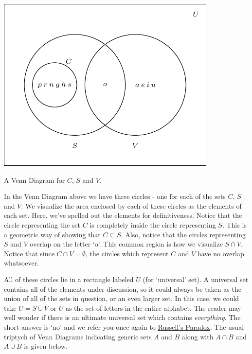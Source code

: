 \documentclass[11pt]{article}
\theoremstyle{definition}  %
\begin{document}
\begin{center}

\includegraphics{SetTheory-1}

A Venn Diagram for $C$, $S$ and $V$.  

\end{center}

In the Venn Diagram above we have three circles - one for each of the sets $C$, $S$ and $V$.  We visualize the area enclosed by each of these circles as the elements of each set.  Here, we've spelled out the elements for definitiveness.  Notice that the circle representing the set $C$ is completely inside the circle representing $S$.  This is a geometric way of  showing that $C \subseteq S$.  Also, notice that the circles representing $S$ and $V$ overlap on the letter `o'.  This common region is how we visualize $S \cap V$.  Notice that since $C \cap V = \emptyset$, the circles which represent $C$ and $V$ have no overlap whatsoever.   

\medskip

All of these circles lie in a rectangle labeled $U$ (for `universal' set).  A universal set contains all of the elements under discussion, so it could always be taken as the union of all of the sets in question, or an even larger set.  In this case, we could take $U = S \cup V$ or $U$ as the set of letters in the entire alphabet.  The reader may well wonder if there is an ultimate universal set which contains \textit{everything}.  The short answer is `no' and we refer you once again to \href{http://en.wikipedia.org/wiki/Russell's_paradox}{\underline{Russell's Paradox}}.  The usual triptych of Venn Diagrams indicating generic sets $A$ and  $B$ along with $A \cap B$ and $A \cup B$ is given below.
\end{document}
